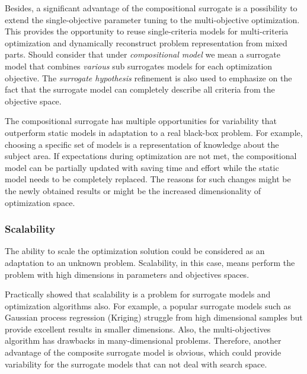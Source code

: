             Besides, a significant advantage of the compositional surrogate is a possibility to extend the single-objective parameter tuning to the multi-objective optimization. This provides the opportunity to reuse single-criteria models for multi-criteria optimization and dynamically reconstruct problem representation from mixed parts.
            Should consider that under \emph{compositional model} we mean a surrogate model that combines \emph{various} sub surrogates models for each optimization objective. The \emph{surrogate hypothesis} refinement is also used to emphasize on the fact that the surrogate model can completely describe all criteria from the objective space.


            The compositional surrogate has multiple opportunities for variability that outperform static models in adaptation to a real black-box problem. For example, choosing a specific set of models is a representation of knowledge about the subject area. If expectations during optimization are not met, the compositional model can be partially updated with saving time and effort while the static model needs to be completely replaced. The reasons for such changes might be the newly obtained results or might be the increased dimensionality of optimization space.

            \subsubsection{Scalability}
                The ability to scale the optimization solution could be considered as an adaptation to an unknown problem. Scalability, in this case, means perform the problem with high dimensions in parameters and objectives spaces.

                Practically showed that scalability is a problem for surrogate models and optimization algorithms also. For example, a popular surrogate models such as Gaussian process regression (Kriging) struggle from high dimensional samples but provide excellent results in smaller dimensions. Also, the multi-objectives algorithm has drawbacks in many-dimensional problems. Therefore, another advantage of the composite surrogate model is obvious, which could provide variability for the surrogate models that can not deal with search space.
                
